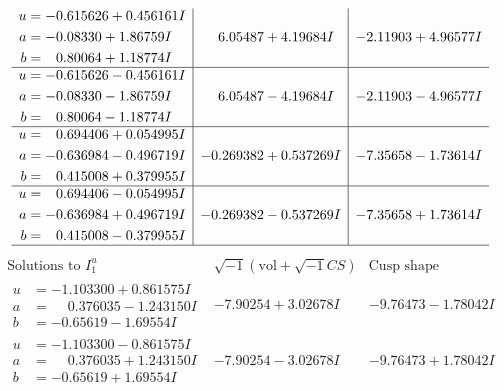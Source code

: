 \documentclass[1p]{elsarticle_modified}
\theoremstyle{definition}
\newcommand{\I}{\sqrt{-1}}
\begin{document}
$$\begin{array}{c|c|c}
\begin{aligned}
u &= -0.615626 + 0.456161 I \\
a &= -0.08330 + 1.86759 I \\
b &= \phantom{-}0.80064 + 1.18774 I\end{aligned}
 & \phantom{-}6.05487 + 4.19684 I & -2.11903 + 4.96577 I \\ \hline\begin{aligned}
u &= -0.615626 - 0.456161 I \\
a &= -0.08330 - 1.86759 I \\
b &= \phantom{-}0.80064 - 1.18774 I\end{aligned}
 & \phantom{-}6.05487 - 4.19684 I & -2.11903 - 4.96577 I \\ \hline\begin{aligned}
u &= \phantom{-}0.694406 + 0.054995 I \\
a &= -0.636984 - 0.496719 I \\
b &= \phantom{-}0.415008 + 0.379955 I\end{aligned}
 & -0.269382 + 0.537269 I & -7.35658 - 1.73614 I \\ \hline\begin{aligned}
u &= \phantom{-}0.694406 - 0.054995 I \\
a &= -0.636984 + 0.496719 I \\
b &= \phantom{-}0.415008 - 0.379955 I\end{aligned}
 & -0.269382 - 0.537269 I & -7.35658 + 1.73614 I\\
 \hline 
 \end{array}$$\newpage$$\begin{array}{c|c|c}  
\text{Solutions to }I^u_{1}& \I (\text{vol} + \sqrt{-1}CS) & \text{Cusp shape}\\
 \hline 
\begin{aligned}
u &= -1.103300 + 0.861575 I \\
a &= \phantom{-}0.376035 - 1.243150 I \\
b &= -0.65619 - 1.69554 I\end{aligned}
 & -7.90254 + 3.02678 I & -9.76473 - 1.78042 I \\ \hline\begin{aligned}
u &= -1.103300 - 0.861575 I \\
a &= \phantom{-}0.376035 + 1.243150 I \\
b &= -0.65619 + 1.69554 I\end{aligned}
 & -7.90254 - 3.02678 I & -9.76473 + 1.78042 I \\ \hline\begin{aligned}

\end{aligned}
\end{array}$$
\end{document}
